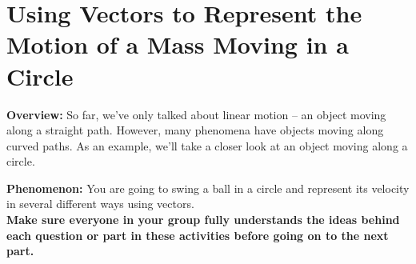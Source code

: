 \section[Representing the Circular Motion of a Mass]{Using Vectors to Represent the Motion of a Mass Moving in a Circle}
\label{act6.1.4}

\begin{overview}

\textbf{Overview:} So far, we've only talked about linear motion -- an object moving along a straight path. However, many phenomena have objects moving along curved paths. As an example, we'll take a closer look at an object moving along a circle.

\end{overview}

\noindent\textbf{Phenomenon:} You are going to swing a ball in a circle and represent its velocity in several different ways using vectors.\\

\noindent\textbf{Make sure everyone in your group fully understands the ideas behind each question or part in these activities before going on to the next part.}


